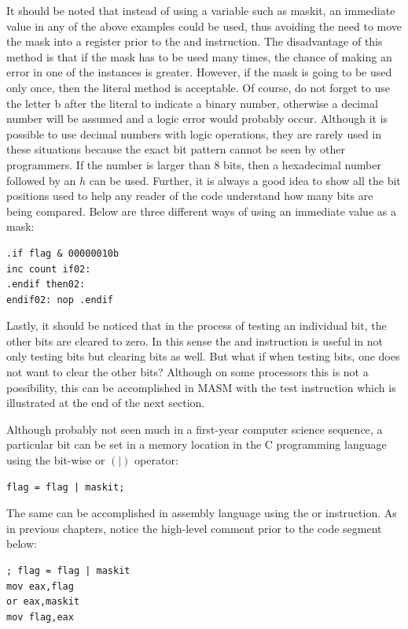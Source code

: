 \documentclass[10pt]{book}
\begin{document}
It should be noted that instead of using a variable such as maskit, an immediate value in any of the above examples could be used, thus avoiding the need to move the mask into a register prior to the and instruction. The disadvantage of this method is that if the mask has to be used many times, the chance of making an error in one of the instances is greater. However, if the mask is going to be used only once, then the literal method is acceptable. Of course, do not forget to use the letter b after the literal to indicate a binary number, otherwise a decimal number will be assumed and a logic error would probably occur. Although it is possible to use decimal numbers with logic operations, they are rarely used in these situations because the exact bit pattern cannot be seen by other programmers. If the number is larger than 8 bits, then a hexadecimal number followed by an $h$ can be used. Further, it is always a good idea to show all the bit positions used to help any reader of the code understand how many bits are being compared. Below are three different ways of using an immediate value as a mask:

\begin{verbatim}
.if flag & 00000010b
inc count if02:
.endif then02:
endif02: nop .endif
\end{verbatim}

Lastly, it should be noticed that in the process of testing an individual bit, the other bits are cleared to zero. In this sense the and instruction is useful in not only testing bits but clearing bits as well. But what if when testing bits, one does not want to clear the other bits? Although on some processors this is not a possibility, this can be accomplished in MASM with the test instruction which is illustrated at the end of the next section.

Although probably not seen much in a first-year computer science sequence, a particular bit can be set in a memory location in the C programming language using the bit-wise or $(\mid)$ operator:

\begin{verbatim}
flag = flag | maskit;
\end{verbatim}

The same can be accomplished in assembly language using the or instruction. As in previous chapters, notice the high-level comment prior to the code segment below:

\begin{verbatim}
; flag = flag | maskit
mov eax,flag
or eax,maskit
mov flag,eax
\end{verbatim}
\end{document}

